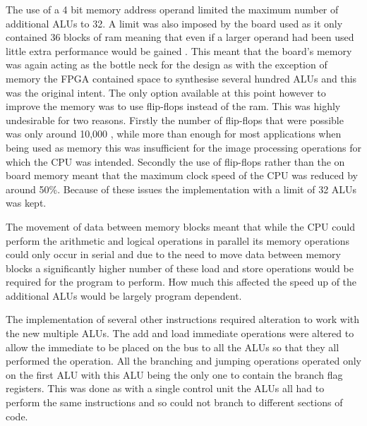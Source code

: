 The use of a 4 bit memory address operand limited the maximum number of additional ALUs to 32. A limit was also imposed by the board used as it only contained 36 blocks of ram meaning that even if a larger operand had been used little extra performance would be gained \cite{spartan_ram}. This meant that the board’s memory was again acting as the bottle neck for the design as with the exception of memory the FPGA contained space to synthesise several hundred ALUs and this was the original intent. The only option available at this point however to improve the memory was to use flip-flops instead of the ram. This was highly undesirable for two reasons. Firstly the number of flip-flops that were possible was only around 10,000 \cite{spartan_user}, while more than enough for most applications when being used as memory this was insufficient for the image processing operations for which the CPU was intended. Secondly the use of flip-flops rather than the on board memory meant that the maximum clock speed of the CPU was reduced by around 50\%. Because of these issues the implementation with a limit of 32 ALUs was kept.

The movement of data between memory blocks meant that while the CPU could perform the arithmetic and logical operations in parallel its memory operations could only occur in serial and due to the need to move data between memory blocks a significantly higher number of these load and store operations would be required for the program to perform. How much this affected the speed up of the additional ALUs would be largely program dependent. 

The implementation of several other instructions required alteration to work with the new multiple ALUs. The add and load immediate operations were altered to allow the immediate to be placed on the bus to all the ALUs so that they all performed the operation. All the branching and jumping operations operated only on the first ALU with this ALU being the only one to contain the branch flag registers. This was done as with a single control unit the ALUs all had to perform the same instructions and so could not branch to different sections of code.
